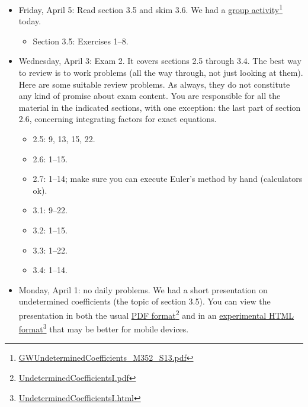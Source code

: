 \begin{itemize}
\item Friday, April 5: Read section 3.5 and skim 3.6. We had a \href{GWUndeterminedCoefficients_M352_S13.pdf}{group activity}\footnote{\href{GWUndeterminedCoefficients_M352_S13.pdf}{GWUndeterminedCoefficients\_M352\_S13.pdf}} today.

\begin{itemize}
\item Section 3.5: Exercises 1--8.

\end{itemize}

\item Wednesday, April 3: Exam 2. It covers sections 2.5 through 3.4. The best way to review is to work problems (all the way through, not just looking at them). Here are some suitable review problems. As always, they do not constitute any kind of promise about exam content. You are responsible for all the material in the indicated sections, with one exception: the last part of section 2.6, concerning integrating factors for exact equations.

\begin{itemize}
\item 2.5: 9, 13, 15, 22.

\item 2.6: 1–15.

\item 2.7: 1--14; make sure you can execute Euler's method by hand (calculators ok).

\item 3.1: 9–22.

\item 3.2: 1–15.

\item 3.3: 1–22.

\item 3.4: 1–14.

\end{itemize}

\item Monday, April 1: no daily problems. We had a short presentation on undetermined coefficients (the topic of section 3.5). You can view the presentation in both the usual \href{UndeterminedCoefficientsI.pdf}{PDF format}\footnote{\href{UndeterminedCoefficientsI.pdf}{UndeterminedCoefficientsI.pdf}} and in an \href{UndeterminedCoefficientsI.html}{experimental HTML format}\footnote{\href{UndeterminedCoefficientsI.html}{UndeterminedCoefficientsI.html}} that may be better for mobile devices.

\end{itemize}

